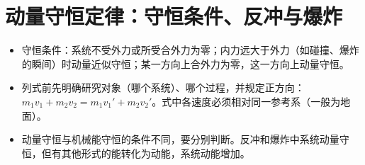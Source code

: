 \documentclass[\gkver]{gaokaozhenti}
\begin{document}
\section{动量守恒定律：守恒条件、反冲与爆炸}
\begin{yaodian}
\begin{itemize}
\item 守恒条件：系统不受外力或所受合外力为零；内力远大于外力（如碰撞、爆炸的瞬间）时动量近似守恒；某一方向上合外力为零，这一方向上动量守恒。
\item 列式前先明确研究对象（哪个系统）、哪个过程，并规定正方向：$m_{1}v_{1}+m_{2}v_{2}=m_{1}v_{1}'+m_{2}v_{2}'$。式中各速度必须相对同一参考系（一般为地面）。
\item 动量守恒与机械能守恒的条件不同，要分别判断。反冲和爆炸中系统动量守恒，但有其他形式的能转化为动能，系统动能增加。
\end{itemize}
\end{yaodian}
\end{document}
